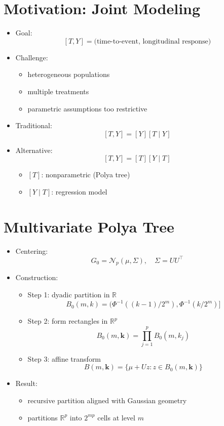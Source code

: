\documentclass[12pt,oneside]{book}
\numberwithin{equation}{section}
\theoremstyle{definition}
\theoremstyle{plain}
\theoremstyle{remark}
\begin{document}
\section{Motivation: Joint Modeling}

\begin{itemize}
\item Goal:
\[
[T, Y] = \text{(time-to-event, longitudinal response)}
\]

\item Challenge:
\begin{itemize}
\item heterogeneous populations
\item multiple treatments
\item parametric assumptions too restrictive
\end{itemize}

\item Traditional:
\[
[T, Y] = [Y][T \mid Y]
\]

\item Alternative:
\[
[T, Y] = [T][Y \mid T]
\]

\begin{itemize}
\item $[T]$: nonparametric (Polya tree)
\item $[Y \mid T]$: regression model
\end{itemize}
\end{itemize}

\section{Multivariate Polya Tree}

\begin{itemize}
\item Centering:
\[
G_0 = \mathcal{N}_p(\mu, \Sigma), \quad \Sigma = UU^\top
\]

\item Construction:

\begin{itemize}
\item Step 1: dyadic partition in $\mathbb{R}$
\[
B_0(m,k) = (\Phi^{-1}((k-1)/2^m), \Phi^{-1}(k/2^m)]
\]

\item Step 2: form rectangles in $\mathbb{R}^p$
\[
B_0(m,\mathbf{k}) = \prod_{j=1}^p B_0(m,k_j)
\]

\item Step 3: affine transform
\[
B(m,\mathbf{k}) = \{\mu + Uz : z \in B_0(m,\mathbf{k})\}
\]
\end{itemize}

\item Result:
\begin{itemize}
\item recursive partition aligned with Gaussian geometry
\item partitions $\mathbb{R}^p$ into $2^{mp}$ cells at level $m$
\end{itemize}
\end{itemize}
\end{document}
